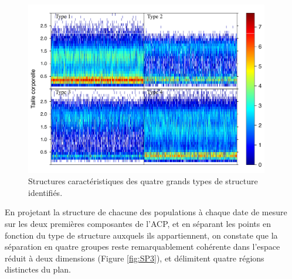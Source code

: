 \begin{figure}[!ht]
\begin{center}
\includegraphics[width=0.95\textwidth]{1_CorpsDeThese/Resumes/Fig/SP02b}
\caption[Quatres grands
types de structures]{Structures caractéristiques des quatre grands types de
structure identifiés.}
\label{fig:SP3a}
\end{center}
\end{figure}

En projetant la structure de chacune des populations à chaque date de mesure
sur les deux premières composantes de l'ACP, et en séparant les points en
fonction du type de structure auxquels ils appartiennent, on constate que la
séparation en quatre groupes reste remarquablement cohérente dans l'espace
réduit à deux dimensions (Figure \ref{fig:SP3}), et délimitent quatre régions
distinctes du plan.

